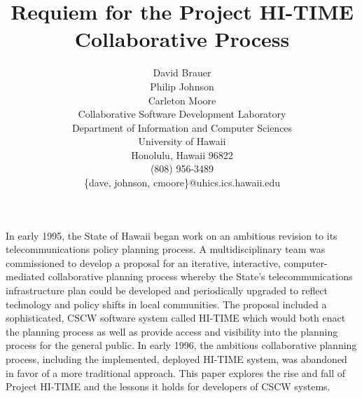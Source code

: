 




\title{Requiem for the Project HI-TIME Collaborative Process}

\author{
David Brauer\\
Philip Johnson\\
Carleton Moore\\
Collaborative Software Development Laboratory\\
Department of Information and Computer Sciences\\
University of Hawaii\\
Honolulu, Hawaii 96822\\
(808) 956-3489\\
\{dave, johnson, cmoore\}@uhics.ics.hawaii.edu}

\maketitle

\abstract 

In early 1995, the State of Hawaii began work on an ambitious revision to
its telecommunications policy planning process.  A multidisciplinary team
was commissioned to develop a proposal for an iterative, interactive,
computer-mediated collaborative planning process whereby the State's
telecommunications infrastructure plan could be developed and periodically
upgraded to reflect technology and policy shifts in local communities. The
proposal included a sophisticated, CSCW software system called HI-TIME
which would both enact the planning process as well as provide access and
visibility into the planning process for the general public.  In early
1996, the ambitious collaborative planning process, including the
implemented, deployed HI-TIME system, was abandoned in favor of a more
traditional approach. This paper explores the rise and fall of Project
HI-TIME and the lessons it holds for developers of CSCW systems.









\newpage






